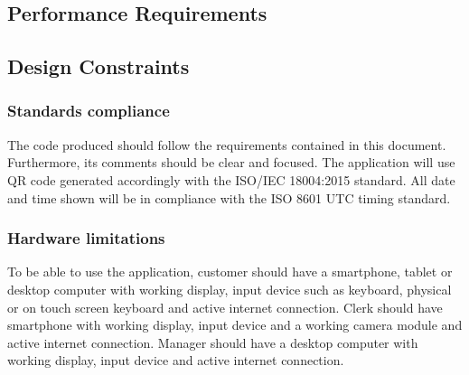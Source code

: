 \subsection{Performance Requirements}


\subsection{Design Constraints}

\subsubsection{Standards compliance}


The code produced should follow the requirements contained in this document. Furthermore, its comments should be clear and focused. The application will use QR code generated accordingly with the ISO/IEC 18004:2015 standard. All date and time shown will be in compliance with the ISO 8601 UTC timing standard.

\subsubsection{Hardware limitations}

To be able to use the application, customer should have a smartphone, tablet or desktop computer with working display, input device such as keyboard, physical or on touch screen keyboard and active internet connection. Clerk should have smartphone with working display, input device and a working camera module and active internet connection. Manager should have a desktop computer with working display, input device and active internet connection.

